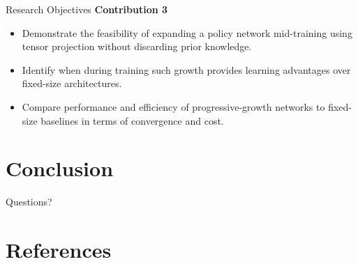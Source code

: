 \documentclass[xcolor={svgnames},aspectratio=169]{beamer}
\begin{document}
\begin{frame}{Research Objectives}
    \textbf{Contribution 3}
    \begin{itemize}
        \item {Demonstrate the feasibility of expanding a policy network mid-training 
            using tensor projection without discarding prior knowledge.}
        \item {Identify when during training such growth provides learning advantages 
            over fixed-size architectures.}
        \item {Compare performance and efficiency of progressive-growth networks to 
            fixed-size baselines in terms of convergence and cost.}
    \end{itemize}
\end{frame}







\section{Conclusion}

\begin{frame}
    \centering
    \Huge
    Questions?
\end{frame}

\section{References}

\renewcommand*{\bibfont}{\tiny}
\frame[allowframebreaks]{\printbibliography}
\end{document}
